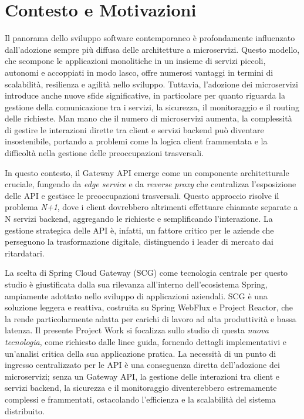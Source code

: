 \section{Contesto e Motivazioni}

Il panorama dello sviluppo software contemporaneo è profondamente influenzato dall'adozione sempre più diffusa delle architetture a microservizi. Questo modello, che scompone le applicazioni monolitiche in un insieme di servizi piccoli, autonomi e accoppiati in modo lasco, offre numerosi vantaggi in termini di scalabilità, resilienza e agilità nello sviluppo. Tuttavia, l'adozione dei microservizi introduce anche nuove sfide significative, in particolare per quanto riguarda la gestione della comunicazione tra i servizi, la sicurezza, il monitoraggio e il routing delle richieste. Man mano che il numero di microservizi aumenta, la complessità di gestire le interazioni dirette tra client e servizi backend può diventare insostenibile, portando a problemi come la logica client frammentata e la difficoltà nella gestione delle preoccupazioni trasversali.

In questo contesto, il Gateway API emerge come un componente architetturale cruciale, fungendo da \textit{edge service} e da \textit{reverse proxy} che centralizza l'esposizione delle API e gestisce le preoccupazioni trasversali. Questo approccio risolve il problema \textit{N+1}, dove i client dovrebbero altrimenti effettuare chiamate separate a N servizi backend, aggregando le richieste e semplificando l'interazione. La gestione strategica delle API è, infatti, un fattore critico per le aziende che perseguono la trasformazione digitale, distinguendo i leader di mercato dai ritardatari.

La scelta di Spring Cloud Gateway (SCG) come tecnologia centrale per questo studio è giustificata dalla sua rilevanza all'interno dell'ecosistema Spring, ampiamente adottato nello sviluppo di applicazioni aziendali. SCG è una soluzione leggera e reattiva, costruita su Spring WebFlux e Project Reactor, che la rende particolarmente adatta per carichi di lavoro ad alta produttività e bassa latenza. Il presente Project Work si focalizza sullo studio di questa \textit{nuova tecnologia}, come richiesto dalle linee guida, fornendo dettagli implementativi e un'analisi critica della sua applicazione pratica. La necessità di un punto di ingresso centralizzato per le API è una conseguenza diretta dell'adozione dei microservizi; senza un Gateway API, la gestione delle interazioni tra client e servizi backend, la sicurezza e il monitoraggio diventerebbero estremamente complessi e frammentati, ostacolando l'efficienza e la scalabilità del sistema distribuito.

